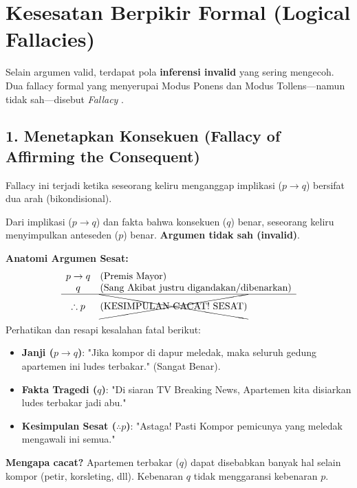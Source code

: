 \section{Kesesatan Berpikir Formal (Logical Fallacies)}

Selain argumen valid, terdapat pola \textbf{inferensi invalid} yang sering mengecoh. Dua fallacy formal yang menyerupai Modus Ponens dan Modus Tollens—namun tidak sah—disebut \textit{Fallacy} \cite{rosen2019,iep_natded,libretexts_proofs}.

\subsection{1. Menetapkan Konsekuen (Fallacy of Affirming the Consequent)}

Fallacy ini terjadi ketika seseorang keliru menganggap implikasi ($p \rightarrow q$) bersifat dua arah (bikondisional). 

\begin{teorema}
Dari implikasi ($p \rightarrow q$) dan fakta bahwa konsekuen ($q$) benar, seseorang keliru menyimpulkan anteseden ($p$) benar. \textbf{Argumen tidak sah (invalid)}. 
\end{teorema}

\textbf{Anatomi Argumen Sesat:}
\[
\begin{array}{cl}
p \rightarrow q & \text{(Premis Mayor)} \\
q & \text{(Sang Akibat justru digandakan/dibenarkan)} \\
\hline
\therefore p & \text{\xcancel{(KESIMPULAN CACAT! SESAT)}}
\end{array}
\]

\begin{contoh}
Perhatikan dan resapi kesalahan fatal berikut:
\begin{itemize}
    \item \textbf{Janji ($p \rightarrow q$)}: "Jika kompor di dapur meledak, maka seluruh gedung apartemen ini ludes terbakar." (Sangat Benar).
    \item \textbf{Fakta Tragedi ($q$)}: "Di siaran TV Breaking News, Apartemen kita disiarkan ludes terbakar jadi abu."
    \item \textbf{Kesimpulan Sesat ($\therefore p$)}: "Astaga! Pasti Kompor pemicunya yang meledak mengawali ini semua."
\end{itemize}
\textbf{Mengapa cacat?} Apartemen terbakar ($q$) dapat disebabkan banyak hal selain kompor (petir, korsleting, dll). Kebenaran $q$ tidak menggaransi kebenaran $p$.
\end{contoh}

